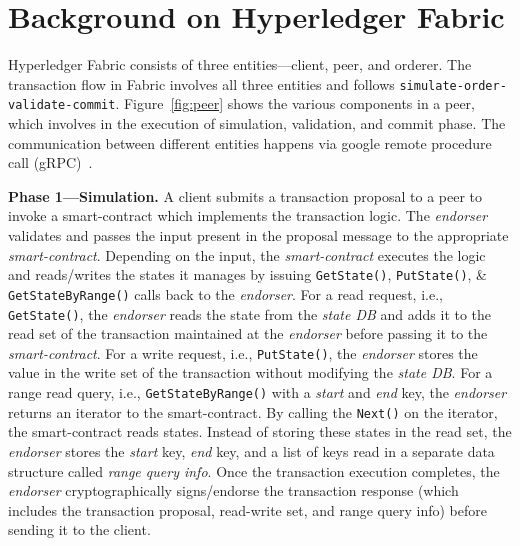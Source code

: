 \section{Background on Hyperledger Fabric}
\label{background}
Hyperledger Fabric consists of three entities---client,
peer, and orderer. The transaction flow in Fabric
involves all three entities and follows \texttt{simulate-order-validate-commit}. 
Figure~\ref{fig:peer} shows the various components in a
peer, which involves in the execution of simulation, validation, and commit phase. The
communication between different entities happens via google
remote procedure call (gRPC)~\cite{grpc}.
\par
\textbf{Phase 1---Simulation.} A client submits a transaction proposal to a peer to invoke a
smart-contract which implements the transaction logic. %
The \textit{endorser} validates
and passes the input present in the proposal message to the
appropriate \textit{smart-contract}. Depending on the input,
the \textit{smart-contract} executes the logic and reads/writes the states it
manages by issuing \texttt{\small{GetState()}}, \texttt{\small{PutState()}}, \&
\texttt{\small{GetStateByRange()}} calls back to the \textit{endorser}. For a read
request, i.e., \texttt{\small{GetState()}}, the \textit{endorser} reads the state
from the \textit{state DB} and adds it to the read set of the transaction maintained
at the \textit{endorser} before passing it to the \textit{smart-contract}.
For a write request, i.e., \texttt{\small{PutState()}}, the \textit{endorser} stores
the value in the write set of the transaction without modifying the
\textit{state DB}. For a range read query, i.e., \texttt{\small{GetStateByRange()}}
with a \textit{start} and \textit{end} key, the \textit{endorser} returns an iterator to
the smart-contract. By calling the \texttt{\small{Next()}} on the iterator, the smart-contract
reads states. Instead of storing these states in the read set, the \textit{endorser}
stores the \textit{start} key, \textit{end} key, and a list of keys read in a separate
data structure called \textit{range query info}. Once the transaction execution completes,
the \textit{endorser} cryptographically signs/endorse the transaction response
(which includes the transaction proposal, read-write set, and range query info)
before sending it to the client.
\par
